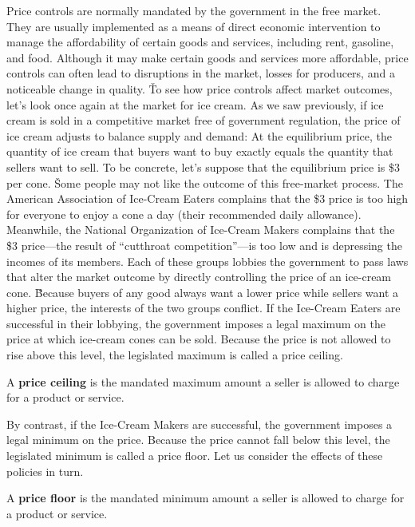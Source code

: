 Price controls are normally mandated by the government in the free market. They are usually implemented as a means of
direct economic intervention to manage the affordability of certain goods and services, including rent, gasoline, and
food. Although it may make certain goods and services more affordable, price controls can often lead to disruptions
in the market, losses for producers, and a noticeable change in quality. \v

To see how price controls affect market outcomes, let's look once again at the market for ice cream. As we saw
previously, if ice cream is sold in a competitive market free of government regulation, the price of ice cream
adjusts to balance supply and demand: At the equilibrium price, the quantity of ice cream that buyers want to buy
exactly equals the quantity that sellers want to sell. To be concrete, let's suppose that the equilibrium price is
\$3 per cone. \v

Some people may not like the outcome of this free-market process. The American Association of Ice-Cream Eaters
complains that the \$3 price is too high for everyone to enjoy a cone a day (their recommended daily allowance).
Meanwhile, the National Organization of Ice-Cream Makers complains that the \$3 price—the result of ``cutthroat
competition''—is too low and is depressing the incomes of its members. Each of these groups lobbies the government to
pass laws that alter the market outcome by directly controlling the price of an ice-cream cone. \v

Because buyers of any good always want a lower price while sellers want a higher price, the interests of the two
groups conflict. If the Ice-Cream Eaters are successful in their lobbying, the government imposes a legal maximum on
the price at which ice-cream cones can be sold. Because the price is not allowed to rise above this level, the
legislated maximum is called a price ceiling.

A \textbf{price ceiling} is the mandated maximum amount a seller is allowed to charge for a product or service.
\ed

By contrast, if the Ice-Cream Makers are successful, the government imposes a legal minimum on the price. Because the
price cannot fall below this level, the legislated minimum is called a price floor. Let us consider the effects of
these policies in turn.

A \textbf{price floor} is the mandated minimum amount a seller is allowed to charge for a product or service.
\ed


